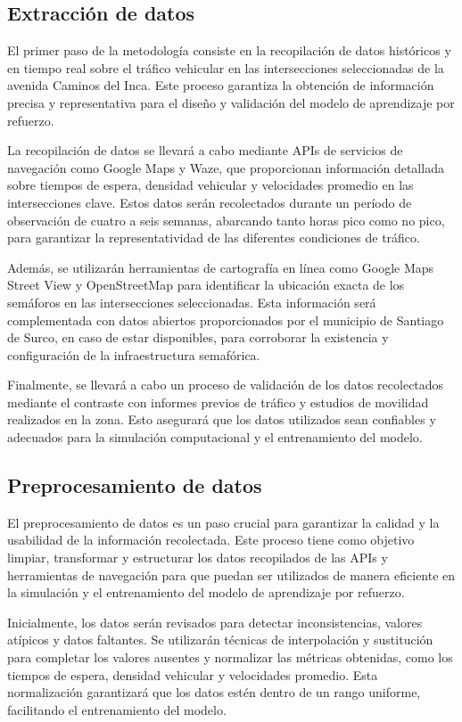 \subsection{Extracción de datos}

El primer paso de la metodología consiste en la recopilación de datos históricos y en tiempo real sobre el tráfico vehicular en las intersecciones seleccionadas de la avenida Caminos del Inca. Este proceso garantiza la obtención de información precisa y representativa para el diseño y validación del modelo de aprendizaje por refuerzo.

La recopilación de datos se llevará a cabo mediante APIs de servicios de navegación como Google Maps y Waze, que proporcionan información detallada sobre tiempos de espera, densidad vehicular y velocidades promedio en las intersecciones clave. Estos datos serán recolectados durante un período de observación de cuatro a seis semanas, abarcando tanto horas pico como no pico, para garantizar la representatividad de las diferentes condiciones de tráfico.

Además, se utilizarán herramientas de cartografía en línea como Google Maps Street View y OpenStreetMap para identificar la ubicación exacta de los semáforos en las intersecciones seleccionadas. Esta información será complementada con datos abiertos proporcionados por el municipio de Santiago de Surco, en caso de estar disponibles, para corroborar la existencia y configuración de la infraestructura semafórica.

Finalmente, se llevará a cabo un proceso de validación de los datos recolectados mediante el contraste con informes previos de tráfico y estudios de movilidad realizados en la zona. Esto asegurará que los datos utilizados sean confiables y adecuados para la simulación computacional y el entrenamiento del modelo.

\subsection{Preprocesamiento de datos}

El preprocesamiento de datos es un paso crucial para garantizar la calidad y la usabilidad de la información recolectada. Este proceso tiene como objetivo limpiar, transformar y estructurar los datos recopilados de las APIs y herramientas de navegación para que puedan ser utilizados de manera eficiente en la simulación y el entrenamiento del modelo de aprendizaje por refuerzo.

Inicialmente, los datos serán revisados para detectar inconsistencias, valores atípicos y datos faltantes. Se utilizarán técnicas de interpolación y sustitución para completar los valores ausentes y normalizar las métricas obtenidas, como los tiempos de espera, densidad vehicular y velocidades promedio. Esta normalización garantizará que los datos estén dentro de un rango uniforme, facilitando el entrenamiento del modelo.

